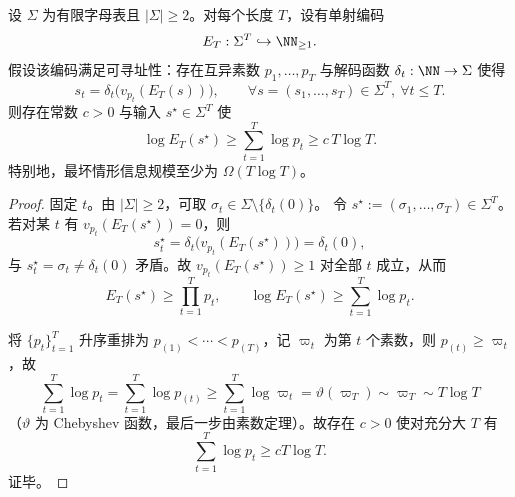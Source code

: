 \begin{proposition}[可寻址哥德尔化外置的最坏情形信息代价]\label{prop:killo-addressable-godelization-info-cost}
设 \(\Sigma\) 为有限字母表且 \(|\Sigma|\ge 2\)。对每个长度 \(T\)，设有单射编码
\[
E_T:\Sigma^T\hookrightarrow \NN_{\ge 1}.
\]
假设该编码满足可寻址性：存在互异素数 \(p_1,\dots,p_T\) 与解码函数 \(\delta_t:\NN\to\Sigma\) 使得
\[
s_t=\delta_t\!\bigl(v_{p_t}(E_T(s))\bigr),\qquad
\forall s=(s_1,\dots,s_T)\in\Sigma^T,\ \forall t\le T.
\]
则存在常数 \(c>0\) 与输入 \(s^\star\in\Sigma^T\) 使
\[
\log E_T(s^\star)\ge \sum_{t=1}^T\log p_t\ge c\,T\log T.
\]
特别地，最坏情形信息规模至少为 \(\Omega(T\log T)\)。
\end{proposition}
\begin{proof}
固定 \(t\)。由 \(|\Sigma|\ge2\)，可取
\(
\sigma_t\in\Sigma\setminus\{\delta_t(0)\}
\)。
令
\(
s^\star:=(\sigma_1,\dots,\sigma_T)\in\Sigma^T
\)。
若对某 \(t\) 有 \(v_{p_t}(E_T(s^\star))=0\)，则
\[
s_t^\star
=\delta_t\!\bigl(v_{p_t}(E_T(s^\star))\bigr)
=\delta_t(0),
\]
与 \(s_t^\star=\sigma_t\neq\delta_t(0)\) 矛盾。故
\(
v_{p_t}(E_T(s^\star))\ge 1
\)
对全部 \(t\) 成立，从而
\[
E_T(s^\star)\ge \prod_{t=1}^T p_t,
\qquad
\log E_T(s^\star)\ge \sum_{t=1}^T\log p_t.
\]

将 \(\{p_t\}_{t=1}^T\) 升序重排为 \(p_{(1)}<\cdots<p_{(T)}\)，记 \(\varpi_t\) 为第 \(t\) 个素数，则 \(p_{(t)}\ge \varpi_t\)，故
\[
\sum_{t=1}^T\log p_t
=\sum_{t=1}^T\log p_{(t)}
\ge \sum_{t=1}^T\log \varpi_t
=\vartheta(\varpi_T)\sim \varpi_T\sim T\log T
\]
（\(\vartheta\) 为 Chebyshev 函数，最后一步由素数定理）。故存在 \(c>0\) 使对充分大 \(T\) 有
\[
\sum_{t=1}^T\log p_t\ge cT\log T.
\]
证毕。
\end{proof}

